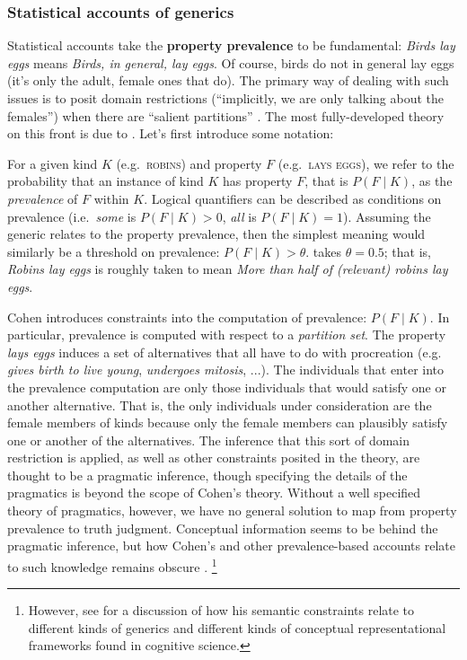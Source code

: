 \documentclass[12pt,letterpaper]{article}
\begin{document}
\subsubsection*{Statistical accounts of generics}

Statistical accounts take the \textbf{property prevalence} to be fundamental: \emph{Birds lay eggs} means \emph{Birds, in general, lay eggs}. 
Of course, birds do not in general lay eggs (it's only the adult, female ones that do).
The primary way of dealing with such issues is to posit domain restrictions (``implicitly, we are only talking about the females'') when there are ``salient partitions'' \cite{Carlson1995}.
The most fully-developed theory on this front is due to . %
Let's first introduce some notation:

For a given kind $K$ (e.g.~\textsc{robins}) and property $F$ (e.g.~\textsc{lays eggs}), we refer to the probability that an instance of kind $K$ has property $F$, that is $P(F\mid K)$, as the \emph{prevalence} of $F$ within $K$.
Logical quantifiers can be described as conditions on prevalence (i.e.~\emph{some} is $P(F\mid K)>0$, \emph{all} is $P(F\mid K)=1$). 
Assuming the generic relates to the property prevalence, then the simplest meaning would similarly be a threshold on prevalence: $P(F\mid K)>\theta$.  takes $\theta = 0.5$; that is, \emph{Robins lay eggs} is roughly taken to mean \emph{More than half of (relevant) robins lay eggs}. 

Cohen introduces constraints into the computation of prevalence: $P(F\mid K)$. In particular, prevalence is computed with respect to a \emph{partition set}. 
The property \emph{lays eggs} induces a set of alternatives that all have to do with procreation (e.g. \emph{gives birth to live young}, \emph{undergoes mitosis}, ...).
The individuals that enter into the prevalence computation are only those individuals that would satisfy one or another alternative. 
That is, the only individuals under consideration are the female members of kinds because only the female members can plausibly satisfy one or another of the alternatives.
The inference that this sort of domain restriction is applied, as well as other constraints posited in the theory, are thought to be a pragmatic inference, though specifying the details of the pragmatics is beyond the scope of Cohen's theory.
Without a well specified theory of pragmatics, however, we have no general solution to map from property prevalence to truth judgment.
Conceptual information seems to be behind the pragmatic inference, but how Cohen's and other prevalence-based accounts relate to such knowledge remains obscure \cite{Carlson1995essay}.
\footnote{However, see  for a discussion of how his semantic constraints relate to different kinds of generics and different kinds of conceptual representational frameworks found in cognitive science.}
\end{document}
